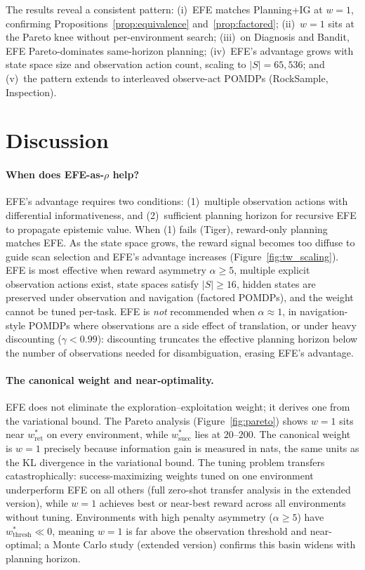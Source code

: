 \documentclass[runningheads]{llncs}
\begin{document}
The results reveal a consistent pattern: (i)~EFE matches Planning+IG at $w{=}1$, confirming Propositions~\ref{prop:equivalence} and~\ref{prop:factored}; (ii)~$w{=}1$ sits at the Pareto knee without per-environment search; (iii)~on Diagnosis and Bandit, EFE Pareto-dominates same-horizon planning; (iv)~EFE's advantage grows with state space size and observation action count, scaling to $|S|{=}65{,}536$; and (v)~the pattern extends to interleaved observe-act POMDPs (RockSample, Inspection).

\section{Discussion}
\label{sec:discussion}

\paragraph{When does EFE-as-$\rho$ help?}
EFE's advantage requires two conditions: (1)~multiple observation actions with differential informativeness, and (2)~sufficient planning horizon for recursive EFE to propagate epistemic value. When (1) fails (Tiger), reward-only planning matches EFE. As the state space grows, the reward signal becomes too diffuse to guide scan selection and EFE's advantage increases (Figure~\ref{fig:tw_scaling}). EFE is most effective when reward asymmetry $\alpha \geq 5$, multiple explicit observation actions exist, state spaces satisfy $|S| \geq 16$, hidden states are preserved under observation and navigation (factored POMDPs), and the weight cannot be tuned per-task. EFE is \emph{not} recommended when $\alpha \approx 1$, in navigation-style POMDPs where observations are a side effect of translation, or under heavy discounting ($\gamma < 0.99$): discounting truncates the effective planning horizon below the number of observations needed for disambiguation, erasing EFE's advantage.

\paragraph{The canonical weight and near-optimality.}
EFE does not eliminate the exploration--exploitation weight; it derives one from the variational bound. The Pareto analysis (Figure~\ref{fig:pareto}) shows $w{=}1$ sits near $w^*_{\text{ret}}$ on every environment, while $w^*_{\text{succ}}$ lies at $20$--$200$. The canonical weight is $w{=}1$ precisely because information gain is measured in nats, the same units as the KL divergence in the variational bound. The tuning problem transfers catastrophically: success-maximizing weights tuned on one environment underperform EFE on all others (full zero-shot transfer analysis in the extended version), while $w{=}1$ achieves best or near-best reward across all environments without tuning. Environments with high penalty asymmetry ($\alpha \geq 5$) have $w^*_{\text{thresh}} \ll 0$, meaning $w{=}1$ is far above the observation threshold and near-optimal; a Monte Carlo study (extended version) confirms this basin widens with planning horizon.
\end{document}
